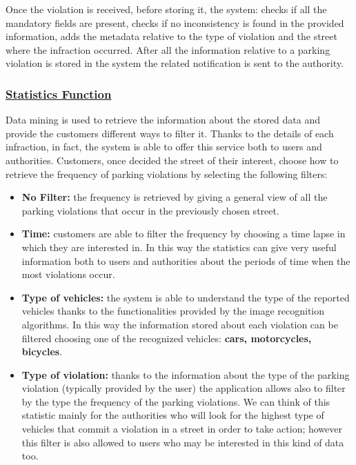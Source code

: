 		Once the violation is received, before storing it, the system: checks if all the mandatory fields are present, checks if no inconsistency is found in the provided information, adds the metadata relative to the type of violation and the street where the infraction occurred. After all the information relative to a parking violation is stored in the system the related notification is sent to the authority. %
		
	\subsubsection[Statistics Function]{\hyperlink{toc}{Statistics Function}}
		Data mining is used to retrieve the information about the stored data and provide the customers different ways to filter it. Thanks to the details of each infraction, in fact, the system is able to offer this service both to users and authorities. Customers, once decided the street of their interest, choose how to retrieve the frequency of parking violations by selecting the following filters:
			
		\begin{itemize}
			\item \textbf{No Filter:} the frequency is retrieved by giving a general view of all the parking violations that occur in the previously chosen street.
			
			\item \textbf{Time:} customers are able to filter the frequency by choosing a time lapse in which they are interested in. In this way the statistics can give very useful information both to users and authorities about the periods of time when the most violations occur.
			
			\item \textbf{Type of vehicles:} the system is able to understand the type of the reported vehicles thanks to the functionalities provided by the image recognition algorithms. In this way the information stored about each violation can be filtered choosing one of the recognized vehicles: \textbf{cars, motorcycles, bicycles}.
			
			\item \textbf{Type of violation:} thanks to the information about the type of the parking violation (typically provided by the user) the application allows also to filter by the type the frequency of the parking violations. We can think of this statistic mainly for the authorities who will look for the highest type of vehicles that commit a violation in a street in order to take action; however this filter is also allowed to users who may be interested in this kind of data too.
		\end{itemize}
	
